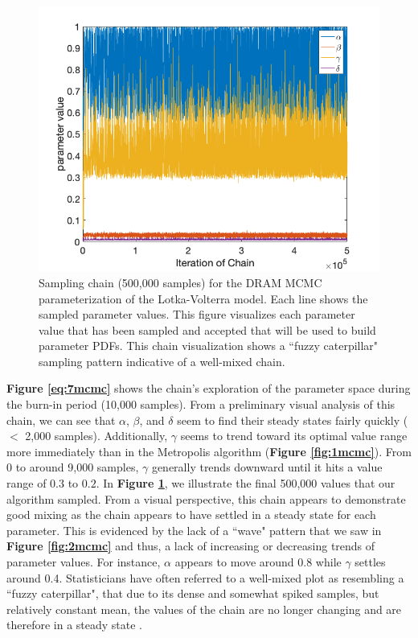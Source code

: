 \documentclass{article}
\begin{document}
\begin{figure}[H]
    \centering
    \includegraphics[width=15cm]{MCMC_figs/met_lv_final/final_dram_chain.png}
    \caption{Sampling chain (500,000 samples) for the DRAM MCMC parameterization of the Lotka-Volterra model. Each line shows the sampled parameter values. This figure visualizes each parameter value that has been sampled and accepted that will be used to build parameter PDFs. This chain visualization shows a ``fuzzy caterpillar" sampling pattern indicative of a well-mixed chain.}
    \label{fig:7mcmc}
\end{figure}
\textbf{Figure \ref{eq:7mcmc}} shows the chain's exploration of the parameter space during the burn-in period (10,000 samples). From a preliminary visual analysis of this chain, we can see that $\alpha$, $\beta$, and $\delta$ seem to find their steady states fairly quickly ($<$ 2,000 samples). Additionally, $\gamma$ seems to trend toward its optimal value range more immediately than in the Metropolis algorithm (\textbf{Figure \ref{fig:1mcmc}}). From 0 to around 9,000 samples, $\gamma$ generally trends downward until it hits a value range of $0.3$ to $0.2$. In \textbf{Figure \ref{fig:7mcmc}}, we illustrate the final 500,000 values that our algorithm sampled. From a visual perspective, this chain appears to demonstrate good mixing as the chain appears to have settled in a steady state for each parameter. This is evidenced by the lack of a ``wave" pattern that we saw in \textbf{Figure \ref{fig:2mcmc}} and thus, a lack of increasing or decreasing trends of parameter values. For instance, $\alpha$ appears to move around 0.8 while $\gamma$ settles around 0.4. Statisticians have often referred to a well-mixed plot as resembling a ``fuzzy caterpillar", that due to its dense and somewhat spiked samples, but relatively constant mean, the values of the chain are no longer changing and are therefore in a steady state \cite{fuzzy_caterpillar}.
\end{document}
